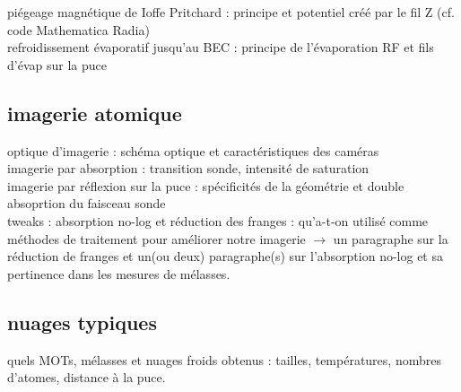 		\noindent piégeage magnétique de Ioffe Pritchard : principe et potentiel créé par le fil Z (cf. code Mathematica Radia)\\
		
		\noindent refroidissement évaporatif jusqu'au BEC : principe de l'évaporation RF et fils d'évap sur la puce
		
	\subsection{imagerie atomique}
		\noindent optique d'imagerie : schéma optique et caractéristiques des caméras \\
		
		\noindent imagerie par absorption : transition sonde, intensité de saturation \\
		\noindent imagerie par réflexion sur la puce : spécificités de la géométrie et double absoprtion du faisceau sonde \\
		
		\noindent tweaks : absorption no-log et réduction des franges : qu'a-t-on utilisé comme méthodes de traitement pour améliorer notre imagerie $\rightarrow$ un paragraphe sur la réduction de franges et un(ou deux) paragraphe(s) sur l'absorption no-log et sa pertinence dans les mesures de mélasses.
		
	\subsection{nuages typiques}
		\noindent quels MOTs, mélasses et nuages froids obtenus : tailles, températures, nombres d'atomes, distance à la puce.